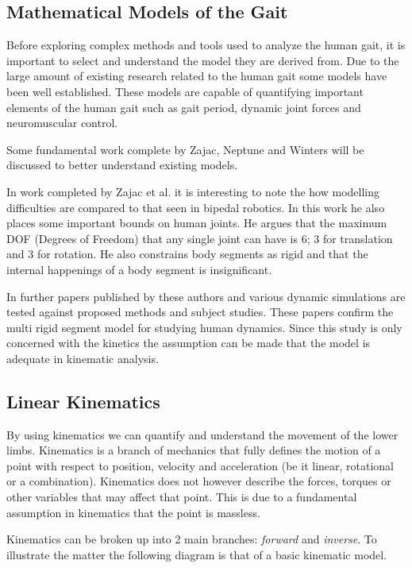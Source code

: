 \subsection{Mathematical Models of the Gait}
Before exploring complex methods and tools used to analyze the human gait, it is important to select and understand the model they are derived from. Due to the large amount of existing research related to the human gait some models have been well established. These models are capable of quantifying important elements of the human gait such as gait period, dynamic joint forces and neuromuscular control. 

Some fundamental work complete by Zajac, Neptune and Winters will be discussed to better understand existing models.

In work completed by Zajac et al. \cite{zajac1990modeling} it is interesting to note the how modelling difficulties are compared to that seen in bipedal robotics. In this work he also places some important bounds on human joints. He argues that the maximum DOF (Degrees of Freedom) that any single joint can have is 6; 3 for translation and 3 for rotation. He also constrains body segments as rigid and that the internal happenings of a body segment is insignificant. 
 
In further papers published by these authors \cite{zajac2002biomechanics} and  \cite{zajac2003biomechanics} various dynamic simulations are tested against proposed methods and subject studies. These papers confirm the multi rigid segment model for studying human dynamics. Since this study is only concerned with the kinetics the assumption can be made that the model is adequate in kinematic analysis. 


\subsection{Linear Kinematics}
By using kinematics we can quantify and understand the movement of the lower limbs. Kinematics is a branch of mechanics that fully defines the motion of a point with respect to position, velocity and acceleration (be it linear, rotational or a combination). Kinematics does not however describe the forces, torques or other variables that may affect that point. This is due to a fundamental assumption in kinematics that the point is massless.	 

Kinematics can be broken up into 2 main branches: \textit{forward} and \textit{inverse}. To illustrate the matter the following diagram is that of a basic kinematic model.

